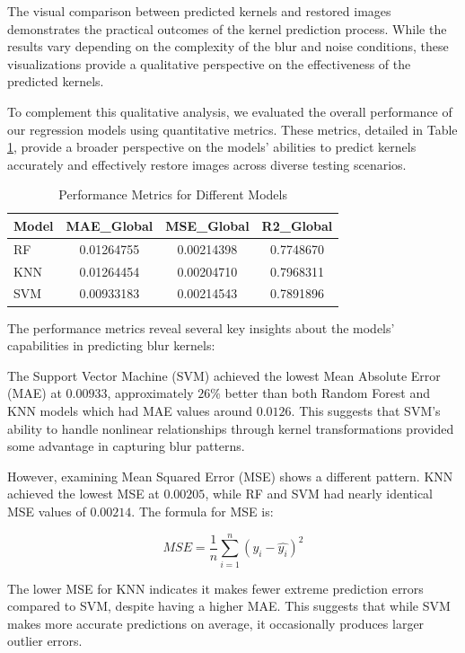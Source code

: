 \documentclass[twoside,11pt]{article}
\begin{document}
The visual comparison between predicted kernels and restored images demonstrates the practical outcomes of the kernel prediction process. While the results vary depending on the complexity of the blur and noise conditions, these visualizations provide a qualitative perspective on the effectiveness of the predicted kernels.

To complement this qualitative analysis, we evaluated the overall performance of our regression models using quantitative metrics. These metrics, detailed in Table \ref{tab:performance}, provide a broader perspective on the models' abilities to predict kernels accurately and effectively restore images across diverse testing scenarios.

\begin{table}[H]
\caption{Performance Metrics for Different Models}
\label{tab:performance}
\begin{center}
\begin{tabular}{lccc}
\hline
Model & MAE\_Global & MSE\_Global & R2\_Global \\
\hline
RF & 0.01264755 & 0.00214398 & 0.7748670 \\
KNN & 0.01264454 & 0.00204710 & 0.7968311 \\
SVM & 0.00933183 & 0.00214543 & 0.7891896 \\
\hline
\end{tabular}
\end{center}
\end{table}


The performance metrics reveal several key insights about the models' capabilities in predicting blur kernels:

The Support Vector Machine (SVM) achieved the lowest Mean Absolute Error (MAE) at $0.00933$, approximately $26\%$ better than both Random Forest and KNN models which had MAE values around $0.0126$. This suggests that SVM's ability to handle nonlinear relationships through kernel transformations provided some advantage in capturing blur patterns.

However, examining Mean Squared Error (MSE) shows a different pattern. KNN achieved the lowest MSE at $0.00205$, while RF and SVM had nearly identical MSE values of $0.00214$. The formula for MSE is:

$$
MSE = \frac{1}{n}\sum_{i=1}^{n}(y_i - \hat{y_i})^2
$$

The lower MSE for KNN indicates it makes fewer extreme prediction errors compared to SVM, despite having a higher MAE. This suggests that while SVM makes more accurate predictions on average, it occasionally produces larger outlier errors.
\end{document}
